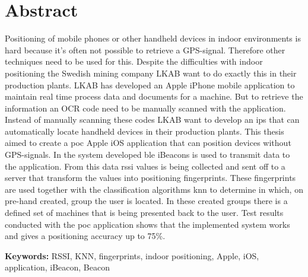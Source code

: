 \newpage
\chapter*{Abstract}
Positioning of mobile phones or other handheld devices in indoor environments is hard because it's often not possible to retrieve a GPS-signal.
Therefore other techniques need to be used for this.
Despite the difficulties with indoor positioning the Swedish mining company LKAB want to do exactly this in  their production plants.
LKAB has developed an Apple iPhone mobile application to maintain real time process data and documents for a machine.
But to retrieve the information an OCR code need to be manually scanned with the application.
Instead of manually scanning these codes LKAB want to develop an \acrlong{ips} that can automatically locate handheld devices in their production plants.
This thesis aimed to create a \acrfull{poc} Apple iOS application that can position devices without GPS-signals.
In the system developed \acrlong{ble} iBeacons is used to transmit data to the application.
From this data \acrlong{rssi} values is being collected and sent off to a server that transform the values into positioning fingerprints.
These fingerprints are used together with the classification algorithms \acrlong{knn} to determine in which, on pre-hand created, group the user is located.
In these created groups there is a defined set of machines that is being presented back to the user.
Test results conducted with the \acrshort{poc} application shows that the implemented system works and gives a positioning accuracy up to 75\%.


\bigskip

\textbf{Keywords:} RSSI, KNN, fingerprints, indoor positioning, Apple, iOS, application, iBeacon, Beacon
